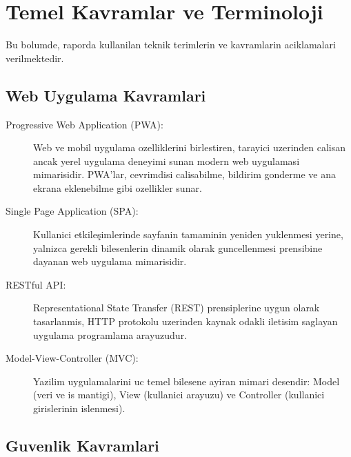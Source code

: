 \section{Temel Kavramlar ve Terminoloji}
\label{sec:temel-kavramlar}

Bu bolumde, raporda kullanilan teknik terimlerin ve kavramlarin 
aciklamalari verilmektedir.

\subsection{Web Uygulama Kavramlari}
\label{subsec:web-kavramlari}

\begin{description}
    \item[Progressive Web Application (PWA):] Web ve mobil uygulama 
    ozelliklerini birlestiren, tarayici uzerinden calisan ancak 
    yerel uygulama deneyimi sunan modern web uygulamasi mimarisidir. 
    PWA'lar, cevrimdisi calisabilme, bildirim gonderme ve ana ekrana 
    eklenebilme gibi ozellikler sunar.
    
    \item[Single Page Application (SPA):] Kullanici etkileşimlerinde 
    sayfanin tamaminin yeniden yuklenmesi yerine, yalnizca gerekli 
    bilesenlerin dinamik olarak guncellenmesi prensibine dayanan 
    web uygulama mimarisidir.
    
    \item[RESTful API:] Representational State Transfer (REST) 
    prensiplerine uygun olarak tasarlanmis, HTTP protokolu uzerinden 
    kaynak odakli iletisim saglayan uygulama programlama arayuzudur.
    
    \item[Model-View-Controller (MVC):] Yazilim uygulamalarini uc 
    temel bilesene ayiran mimari desendir: Model (veri ve is 
    mantigi), View (kullanici arayuzu) ve Controller (kullanici 
    girislerinin islenmesi).
\end{description}

\subsection{Guvenlik Kavramlari}
\label{subsec:guvenlik-kavramlari}

